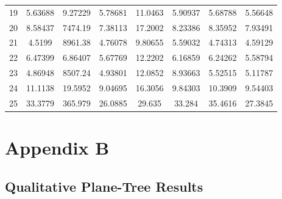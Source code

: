 \begin{center}
\begin{longtable}{cccccccc}
19 & 5.63688 & 9.27229 & 5.78681 & 11.0463 & 5.90937 & 5.68788 & 5.56648\\
20 & 8.58437 & 7474.19 & 7.38113 & 17.2002 & 8.23386 & 8.35952 & 7.93491\\
21 & 4.5199 & 8961.38 & 4.76078 & 9.80655 & 5.59032 & 4.74313 & 4.59129\\
22 & 6.47399 & 6.86407 & 5.67769 & 12.2202 & 6.16859 & 6.24262 & 5.58794\\
23 & 4.86948 & 8507.24 & 4.93801 & 12.0852 & 8.93663 & 5.52515 & 5.11787\\
24 & 11.1138 & 19.5952 & 9.04695 & 16.3056 & 9.84303 & 10.3909 & 9.54403\\
25 & 33.3779 & 365.979 & 26.0885 & 29.635 & 33.284 & 35.4616 & 27.3845\\
\end{longtable}
\end{center}


\makeatletter
\chapter{Appendix B}
\label{QualitativeLargeImage}

\section{Qualitative Plane-Tree Results}
\label{AppBQualPT}

